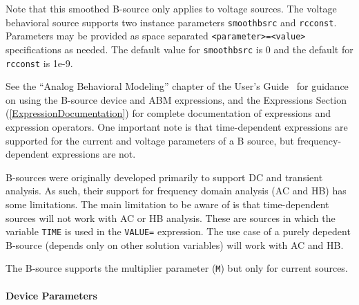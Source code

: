 \begin{Device}
Note that this smoothed B-source only applies to voltage sources. The voltage behavioral source supports
two instance parameters \texttt{smoothbsrc} and \texttt{rcconst}. Parameters may be provided as space  
separated \texttt{<parameter>=<value>} specifications as needed. The default value for \texttt{smoothbsrc}
is 0 and the default for \texttt{rcconst} is 1e-9.

See the ``Analog Behavioral Modeling'' chapter of the \Xyce{} User's
Guide~\UsersGuide{} for guidance on using the B-source device and ABM expressions,
and the Expressions Section (\ref{ExpressionDocumentation}) for
complete documentation of expressions and expression operators.
One important note is that time-dependent expressions are supported
for the current and voltage parameters of a B source, but
frequency-dependent expressions are not.

B-sources were originally developed primarily to support DC and transient analysis.  
As such, their support for frequency domain analysis (AC and HB) has some limitations.  
The main limitation to be aware of is that time-dependent sources will not work with AC or HB analysis.  
These are sources in which the variable \texttt{TIME} is used in the \texttt{VALUE=} expression. 
The use case of a purely depedent B-source (depends only on other solution variables) will work with AC and HB.  

The B-source supports the multiplier parameter (\texttt{M}) but only for current sources.

\newpage
\paragraph{Device Parameters}


\end{Device}
